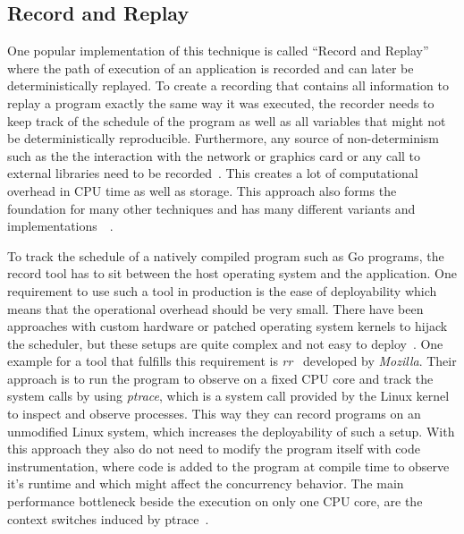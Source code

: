 \documentclass[conference]{IEEEtran}
\begin{document}
\subsection{Record and Replay}
One popular implementation of this technique is called ``Record and Replay'' where the path of execution of an application is recorded and can later be deterministically replayed.
To create a recording that contains all information to replay a program exactly the same way it was executed, the recorder needs to keep track of the schedule of the program as well as all variables that might not be deterministically reproducible.
Furthermore, any source of non-determinism such as the the interaction with the network or graphics card or any call to external libraries need to be recorded~\cite{lidbury2019sparse}.
This creates a lot of computational overhead in CPU time as well as storage.
This approach also forms the foundation for many other techniques and has many different variants and implementations~\cite{acm2002}~\cite{lidbury2019sparse}.

To track the schedule of a natively compiled program such as Go programs, the record tool has to sit between the host operating system and the application.
One requirement to use such a tool in production is the ease of deployability which means that the operational overhead should be very small.
There have been approaches with custom hardware or patched operating system kernels to hijack the scheduler, but these setups are quite complex and not easy to deploy~\cite{o2017engineering}.
One example for a tool that fulfills this requirement is \emph{rr}~\cite{mozillarr} developed by \emph{Mozilla}.
Their approach is to run the program to observe on a fixed CPU core and track the system calls by using \emph{ptrace}, which is a system call provided by the Linux kernel to inspect and observe processes.
This way they can record programs on an unmodified Linux system, which increases the deployability of such a setup.
With this approach they also do not need to modify the program itself with code instrumentation, where code is added to the program at compile time to observe it's runtime and which might affect the concurrency behavior.
The main performance bottleneck beside the execution on only one CPU core, are the context switches induced by ptrace~\cite{o2017engineering}.
\end{document}
